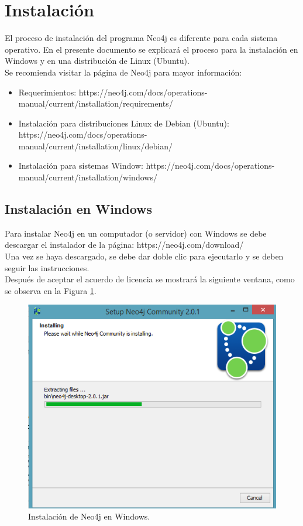 \documentclass[conference]{IEEEtran}
\begin{document}
\section{Instalación}
El proceso de instalación del programa Neo4j es diferente para cada sistema operativo. En el presente documento se explicará el proceso para la instalación en Windows y en una distribución de Linux (Ubuntu).\\
Se recomienda visitar la página de Neo4j para mayor información: 
\begin{itemize}
\item Requerimientos: https://neo4j.com/docs/operations-manual/current/installation/requirements/ 
\item Instalación para distribuciones Linux de Debian (Ubuntu):  https://neo4j.com/docs/operations-manual/current/installation/linux/debian/
\item Instalación para sistemas Window: https://neo4j.com/docs/operations-manual/current/installation/windows/
\end{itemize}

\subsection{Instalación en Windows}\label{AA}
Para instalar Neo4j en un computador (o servidor) con Windows se debe descargar el instalador de la página: https://neo4j.com/download/ \\
Una vez se haya descargado, se debe dar doble clic para ejecutarlo y se deben seguir las instrucciones. \\
Después de aceptar el acuerdo de licencia se mostrará la siguiente ventana, como se observa en la Figura \ref{fig3}.

\begin{figure}[H]
\begin{center}
\includegraphics[width= 0.45 \textwidth]{neo4j_install02.png}
\end{center}
\caption{Instalación de Neo4j en Windows.}
\label{fig3}
\end{figure}
\end{document}
